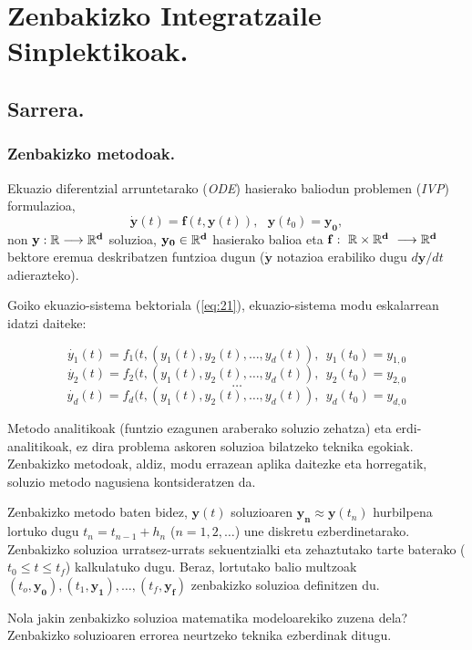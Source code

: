 \chapter{Zenbakizko Integratzaile Sinplektikoak.}

\section{Sarrera.}

\subsection{Zenbakizko metodoak.}

Ekuazio diferentzial arruntetarako (\emph{ODE}) hasierako baliodun problemen (\emph{IVP}) formulazioa,
\begin{equation}
\label{eq:21}
\dot{\mathbf{y}}(t)=\mathbf{f}(t,\mathbf{y}(t)),\ \ \ \mathbf{y}(t_0)=\mathbf{y_0}, 
\end{equation}
non  $\bf{y}: \mathbb{R} \longrightarrow {\mathbb{R}}^d$ soluzioa, $\bf{y_0} \in \mathbb{R}^d$ hasierako balioa eta $\bf{f}: \ \mathbb{R} \times {\mathbb{R}}^d \ \longrightarrow {\mathbb{R}}^d$ bektore eremua deskribatzen funtzioa dugun ($\dot{\mathbf{y}}$ notazioa erabiliko dugu $d\mathbf{y}/dt$ adierazteko).

Goiko ekuazio-sistema bektoriala (\ref{eq:21}), ekuazio-sistema modu eskalarrean idatzi daiteke:

\[\dot{y_1}(t)=f_1(t,(y_1(t),y_2(t),\dots,y_d(t)), \ \ y_1(t_0)=y_{1,0}\]
\[\dot{y_2}(t)=f_2(t,(y_1(t),y_2(t),\dots,y_d(t)), \ \ y_2(t_0)=y_{2,0}\]
\[\dots\]
\[\dot{y_d}(t)=f_d(t,(y_1(t),y_2(t),\dots,y_d(t)),  \ \ y_d(t_0)=y_{d,0}\]


Metodo analitikoak (funtzio ezagunen araberako soluzio zehatza) eta erdi-analitikoak, ez dira problema askoren soluzioa bilatzeko teknika egokiak. Zenbakizko metodoak, aldiz, modu errazean aplika daitezke eta horregatik, soluzio metodo nagusiena kontsideratzen da. 

Zenbakizko metodo baten bidez, $\mathbf{y}(t)$ soluzioaren $\mathbf{y_n} \approx \mathbf{y}(t_n)$ hurbilpena lortuko dugu $t_n=t_{n-1}+h_n$  ($n=1,2,\dots$)  une diskretu ezberdinetarako. Zenbakizko soluzioa urratsez-urrats sekuentzialki eta zehaztutako tarte baterako ($t_0\le t \le t_f$) kalkulatuko dugu. Beraz, lortutako balio  multzoak $(t_o,\mathbf{y_0}),(t_1,\mathbf{y_1}),\dots,(t_f,\mathbf{y_f})$ zenbakizko soluzioa definitzen du.   

Nola jakin zenbakizko soluzioa matematika modeloarekiko zuzena dela? Zenbakizko soluzioaren errorea neurtzeko teknika ezberdinak ditugu.           

